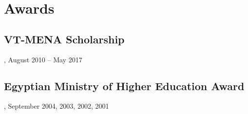\section{Awards}
\subsection{VT-MENA Scholarship}, August 2010 -- May 2017

\subsection{Egyptian Ministry of Higher Education Award}, September 2004, 2003, 2002, 2001
